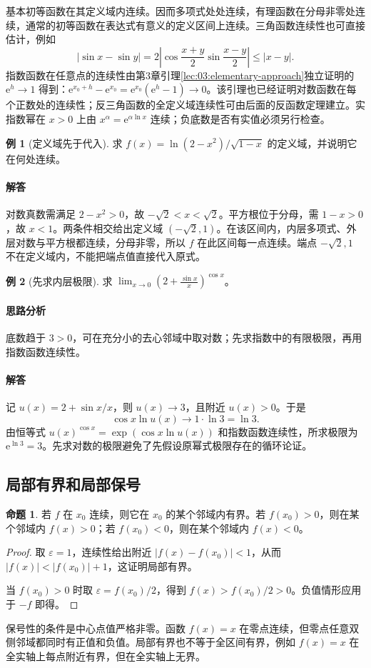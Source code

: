 \documentclass[UTF8,fontset=fandol,12pt,oneside,openany]{ctexrep}
\newcommand{\ee}{\mathrm e}
\theoremstyle{definition}
\newtheorem{proposition}[theorem]{命题}
\newtheorem{example}{例}[chapter]
\begin{document}
基本初等函数在其定义域内连续。因而多项式处处连续，有理函数在分母非零处连续，通常的初等函数在表达式有意义的定义区间上连续。三角函数连续性也可直接估计，例如
\[
 |\sin x-\sin y|
 =2\left|\cos\frac{x+y}{2}\sin\frac{x-y}{2}\right|
 \le |x-y|.
\]
指数函数在任意点的连续性由第3章引理\ref{lec:03:elementary-approach}独立证明的 $\ee^h\to1$ 得到：$\ee^{x_0+h}-\ee^{x_0}=\ee^{x_0}(\ee^h-1)\to0$。该引理也已经证明对数函数在每个正数处的连续性；反三角函数的全定义域连续性可由后面的反函数定理建立。实指数幂在 $x>0$ 上由 $x^\alpha=\ee^{\alpha\ln x}$ 连续；负底数是否有实值必须另行检查。

\begin{example}[定义域先于代入]
求 $f(x)=\ln(2-x^2)/\sqrt{1-x}$ 的定义域，并说明它在何处连续。
\end{example}
\paragraph{解答}
对数真数需满足 $2-x^2>0$，故 $-\sqrt2<x<\sqrt2$。平方根位于分母，需 $1-x>0$，故 $x<1$。两条件相交给出定义域 $(-\sqrt2,1)$。在该区间内，内层多项式、外层对数与平方根都连续，分母非零，所以 $f$ 在此区间每一点连续。端点 $-\sqrt2,1$ 不在定义域内，不能把端点值直接代入原式。

\begin{example}[先求内层极限]
求 $\displaystyle\lim_{x\to0}\left(2+\frac{\sin x}{x}\right)^{\cos x}$。
\end{example}
\paragraph{思路分析}
底数趋于 $3>0$，可在充分小的去心邻域中取对数；先求指数中的有限极限，再用指数函数连续性。
\paragraph{解答}
记 $u(x)=2+\sin x/x$，则 $u(x)\to3$，且附近 $u(x)>0$。于是
\[
 \cos x\ln u(x)\longrightarrow1\cdot\ln3=\ln3.
\]
由恒等式 $u(x)^{\cos x}=\exp(\cos x\ln u(x))$ 和指数函数连续性，所求极限为 $\ee^{\ln3}=3$。先求对数的极限避免了先假设原幂式极限存在的循环论证。

\subsection{局部有界和局部保号}
\begin{proposition}
若 $f$ 在 $x_0$ 连续，则它在 $x_0$ 的某个邻域内有界。若 $f(x_0)>0$，则在某个邻域内 $f(x)>0$；若 $f(x_0)<0$，则在某个邻域内 $f(x)<0$。
\end{proposition}
\begin{proof}
取 $\varepsilon=1$，连续性给出附近 $|f(x)-f(x_0)|<1$，从而 $|f(x)|<|f(x_0)|+1$，这证明局部有界。

当 $f(x_0)>0$ 时取 $\varepsilon=f(x_0)/2$，得到 $f(x)>f(x_0)/2>0$。负值情形应用于 $-f$ 即得。
\end{proof}
保号性的条件是中心点值严格非零。函数 $f(x)=x$ 在零点连续，但零点任意双侧邻域都同时有正值和负值。局部有界也不等于全区间有界，例如 $f(x)=x$ 在全实轴上每点附近有界，但在全实轴上无界。
\end{document}
